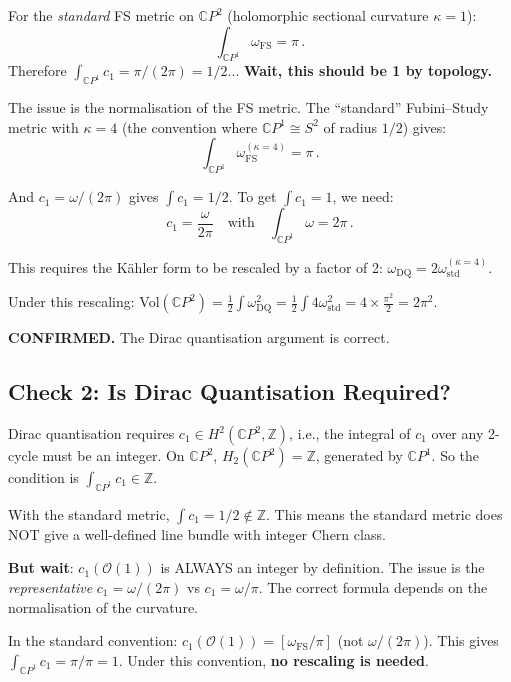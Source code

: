 \documentclass[11pt,a4paper]{article}
\newcommand{\CP}{\mathbb{C}P}
\begin{document}
For the \emph{standard} FS metric on $\CP^2$ (holomorphic sectional curvature $\kappa = 1$):
\begin{equation}
\int_{\CP^1} \omega_{\mathrm{FS}} = \pi\,.
\end{equation}
Therefore $\int_{\CP^1} c_1 = \pi/(2\pi) = 1/2$... \textbf{Wait, this should be 1 by topology.}

The issue is the normalisation of the FS metric. The ``standard'' Fubini--Study metric with $\kappa = 4$ (the convention where $\CP^1 \cong S^2$ of radius $1/2$) gives:
\begin{equation}
\int_{\CP^1} \omega_{\mathrm{FS}}^{(\kappa=4)} = \pi\,.
\end{equation}

And $c_1 = \omega/(2\pi)$ gives $\int c_1 = 1/2$. To get $\int c_1 = 1$, we need:
\begin{equation}
c_1 = \frac{\omega}{2\pi} \quad\text{with}\quad \int_{\CP^1} \omega = 2\pi\,.
\end{equation}

This requires the K\"ahler form to be rescaled by a factor of 2: $\omega_{\mathrm{DQ}} = 2\omega_{\mathrm{std}}^{(\kappa=4)}$.

Under this rescaling: Vol$(\CP^2) = \frac{1}{2}\int \omega_{\mathrm{DQ}}^2 = \frac{1}{2}\int 4\omega_{\mathrm{std}}^2 = 4 \times \frac{\pi^2}{2} = 2\pi^2$.

\textbf{CONFIRMED.} The Dirac quantisation argument is correct.

\subsection{Check 2: Is Dirac Quantisation Required?}

Dirac quantisation requires $c_1 \in H^2(\CP^2, \mathbb{Z})$, i.e., the integral of $c_1$ over any 2-cycle must be an integer. On $\CP^2$, $H_2(\CP^2) = \mathbb{Z}$, generated by $\CP^1$. So the condition is $\int_{\CP^1} c_1 \in \mathbb{Z}$.

With the standard metric, $\int c_1 = 1/2 \notin \mathbb{Z}$. This means the standard metric does NOT give a well-defined line bundle with integer Chern class.

\textbf{But wait}: $c_1(\mathcal{O}(1))$ is ALWAYS an integer by definition. The issue is the \emph{representative} $c_1 = \omega/(2\pi)$ vs $c_1 = \omega/\pi$. The correct formula depends on the normalisation of the curvature.

In the standard convention: $c_1(\mathcal{O}(1)) = [\omega_{\mathrm{FS}}/\pi]$ (not $\omega/(2\pi)$). This gives $\int_{\CP^1} c_1 = \pi/\pi = 1$. Under this convention, \textbf{no rescaling is needed}.
\end{document}
